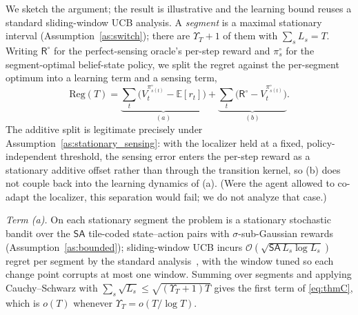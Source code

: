 \documentclass[journal]{IEEEtran}
\newcommand{\E}{\mathbb{E}}
\newcommand{\pol}{\pi}                     %
\newcommand{\bigT}{T}                      %
\newcommand{\thru}{\mathsf{R}}             %
\newcommand{\regret}{\mathrm{Reg}}         %
\begin{document}
We sketch the argument; the result is illustrative and the learning bound
reuses a standard sliding-window UCB analysis. A \emph{segment} is a maximal
stationary interval (Assumption~\ref{as:switch}); there are
$\Upsilon_{\bigT}+1$ of them with $\sum_s L_s=\bigT$. Writing $\thru^{\circ}$
for the perfect-sensing oracle's per-step reward and $\pol^{\circ}_s$ for the
segment-optimal belief-state policy, we split the regret against the
per-segment optimum into a learning term and a sensing term,
\begin{equation}
\regret(\bigT)=
\underbrace{\textstyle\sum_{t}\big(V^{\pol^{\circ}_{s(t)}}_t-\E[r_t]\big)}_{(a)}
+\underbrace{\textstyle\sum_{t}\big(\thru^{\circ}-V^{\pol^{\circ}_{s(t)}}_t\big)}_{(b)}.
\label{eq:appC_decomp}
\end{equation}
The additive split is legitimate precisely under
Assumption~\ref{as:stationary_sensing}: with the localizer held at a fixed,
policy-independent threshold, the sensing error enters the per-step reward as
a stationary additive offset rather than through the transition kernel, so (b)
does not couple back into the learning dynamics of (a). (Were the agent
allowed to co-adapt the localizer, this separation would fail; we do not
analyze that case.)

\emph{Term (a).} On each stationary segment the problem is a stationary
stochastic bandit over the $\mathsf{SA}$ tile-coded state--action pairs with
$\sigma$-sub-Gaussian rewards (Assumption~\ref{as:bounded}); sliding-window
UCB incurs $\mathcal{O}(\sqrt{\mathsf{SA}\,L_s\log L_s})$ regret per segment by
the standard analysis~\cite{garivier2011ucb}, with the window tuned so each
change point corrupts at most one window. Summing over segments and applying
Cauchy--Schwarz with $\sum_s\sqrt{L_s}\le\sqrt{(\Upsilon_{\bigT}{+}1)\bigT}$
gives the first term of \eqref{eq:thmC}, which is $o(\bigT)$ whenever
$\Upsilon_{\bigT}=o(\bigT/\log\bigT)$.
\end{document}
